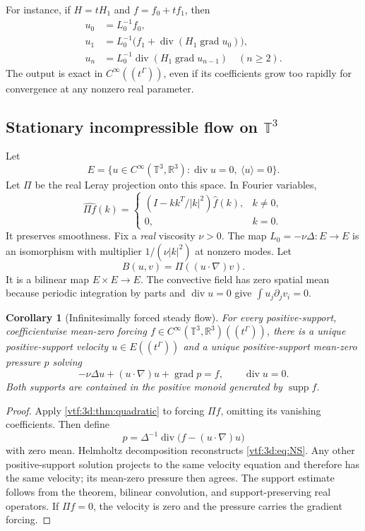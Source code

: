 \documentclass[11pt,letterpaper]{article}
\newtheorem{corollary}[theorem]{Corollary}
\theoremstyle{definition}
\theoremstyle{remark}
\newcommand{\R}{\mathbb R}\newcommand{\C}{\mathbb C}
\newcommand{\supp}{\operatorname{supp}}\newcommand{\st}{\operatorname{st}}
\newcommand{\grad}{\operatorname{grad}}\newcommand{\Div}{\operatorname{div}}
\begin{document}
For instance, if $H=tH_1$ and $f=f_0+tf_1$, then
\begin{align*}
 u_0&=L_0^{-1}f_0,\\
 u_1&=L_0^{-1}\bigl(f_1+\Div(H_1\grad u_0)\bigr),\\
 u_n&=L_0^{-1}\Div(H_1\grad u_{n-1})\quad(n\geq2).
\end{align*}
The output is exact in $C^\infty((t^\Gamma))$, even if its coefficients grow too rapidly for convergence at any nonzero real parameter.

\subsection{Stationary incompressible flow on \texorpdfstring{$\mathbb T^3$}{the three-torus}}
Let
\[
 E=\{u\in C^\infty(\mathbb T^3,\R^3):\Div u=0,\ \langle u\rangle=0\}.
\]
Let $\Pi$ be the real Leray projection onto this space. In Fourier variables,
\[
 \widehat{\Pi f}(k)=
 \begin{cases}
 \left(I-kk^T/|k|^2\right)\widehat f(k),&k\ne0,\\
 0,&k=0.
 \end{cases}
\]
It preserves smoothness. Fix a \emph{real} viscosity $\nu>0$. The map
$L_0=-\nu\Delta:E\to E$ is an isomorphism with multiplier $1/(\nu|k|^2)$ at nonzero modes. Let
\[
 B(u,v)=\Pi((u\cdot\nabla)v).
\]
It is a bilinear map $E\times E\to E$. The convective field has zero spatial mean because periodic integration by parts and $\Div u=0$ give
$\int u_j\partial_jv_i=0$.

\begin{corollary}[Infinitesimally forced steady flow]\label{vtf:3d:cor:ns}
For every positive-support, coefficientwise mean-zero forcing
$f\in C^\infty(\mathbb T^3,\R^3)((t^\Gamma))$, there is a unique positive-support velocity $u\in E((t^\Gamma))$ and a unique positive-support mean-zero pressure $p$ solving
\begin{equation}\label{vtf:3d:eq:NS}
 -\nu\Delta u+(u\cdot\nabla)u+\grad p=f,
 \qquad\Div u=0.
\end{equation}
Both supports are contained in the positive monoid generated by $\supp f$.
\end{corollary}
\begin{proof}
Apply \cref{vtf:3d:thm:quadratic} to forcing $\Pi f$, omitting its vanishing coefficients. Then define
\[
 p=\Delta^{-1}\Div\bigl(f-(u\cdot\nabla)u\bigr)
\]
with zero mean. Helmholtz decomposition reconstructs \eqref{vtf:3d:eq:NS}. Any other positive-support solution projects to the same velocity equation and therefore has the same velocity; its mean-zero pressure then agrees. The support estimate follows from the theorem, bilinear convolution, and support-preserving real operators. If $\Pi f=0$, the velocity is zero and the pressure carries the gradient forcing.
\end{proof}
\end{document}
